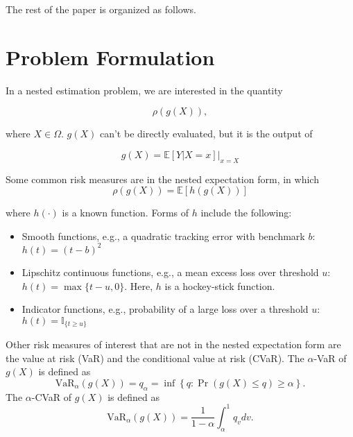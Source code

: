 The rest of the paper is organized as follows.



\section{Problem Formulation} \label{sec:problem-formulation}

In a nested estimation problem, we are interested in the quantity 

$$\rho(g(X)), $$

where $X \in \Omega$. 
$g(X)$ can't be directly evaluated, but it is the output of 

$$ g(X) = \mathbb{E}\left[ Y|X=x \right]\vert_{x=X} $$

Some common risk measures are in the nested expectation form, in which 
$$\rho(g(X)) = \mathbb{E}\left[ h(g(X)) \right]$$

where $h(\cdot)$ is a known function. 
Forms of $h$ include the following:
\begin{itemize}
    \item 	Smooth functions, e.g., a quadratic tracking error with benchmark $b$: $h(t) = (t - b)^2$
    \item 	Lipschitz continuous functions, e.g., a mean excess loss over threshold $u$: $h(t) = \max\{t - u, 0\}$. Here, $h$ is a hockey-stick function.
    \item 	Indicator functions, e.g., probability of a large loss over a threshold $u$: $h(t) = \mathbb{I}_{\{t \geqslant u\}}$
\end{itemize}

Other risk measures of interest that are not in the nested expectation form are the value at risk (VaR) and the conditional value at risk (CVaR). 
The $\alpha$-VaR of $g(X)$ is defined as
$$
    \mbox{VaR}_\alpha(g(X)) = q_\alpha = \inf \left\{ q: \Pr(g(X)\leq q) \geq \alpha \right\}.
$$
The $\alpha$-CVaR of $g(X)$ is defined as
$$
    \mbox{VaR}_\alpha(g(X)) =\frac{1}{1-\alpha} \int_{\alpha}^{1} q_v dv. 
$$

